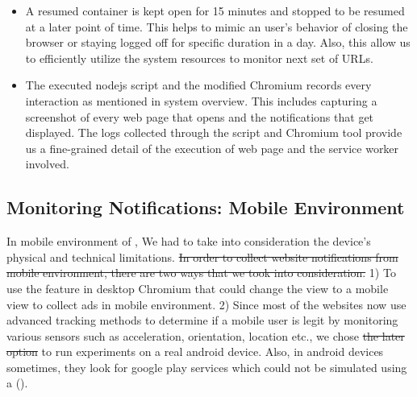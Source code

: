 \begin{itemize}
    \item A resumed container is kept open for 15 minutes and stopped to be resumed at a later point of time. This helps to mimic an user's behavior of closing the browser or staying logged off for specific duration in a day. Also, this allow us to efficiently utilize the system resources to monitor next set of URLs. 
    \item The executed nodejs script and the modified Chromium records every interaction as mentioned in system overview. This includes capturing a screenshot of every web page that opens and the notifications that get displayed. The logs collected through the script and Chromium tool provide us a fine-grained detail of the execution of web page and the service worker involved. 
\end{itemize}

\subsection{Monitoring Notifications: Mobile Environment} \label{monitoring}
In mobile environment of \sysname, We had to take into consideration the device's physical and technical limitations. \st{In order to collect website notifications from mobile environment, there are two ways that we took into consideration.} 1) To use the feature in desktop Chromium that could change the view to a mobile view to collect ads in mobile environment.  2) Since most of the websites now use advanced tracking methods to determine if a mobile user is legit by monitoring various sensors such as acceleration, orientation, location etc., we chose \st{the later option} to run experiments on a real android device. Also, in android devices sometimes, they look for google play services which could not be simulated using a (). 

